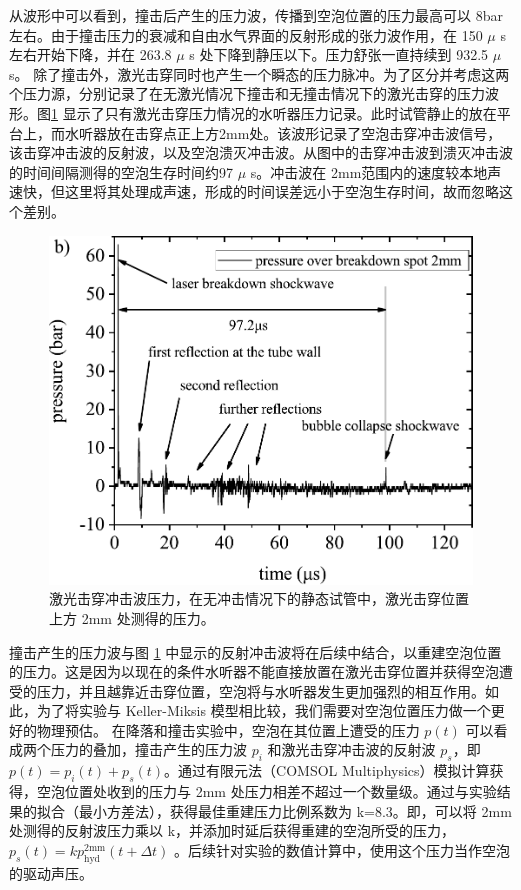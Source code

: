 从波形中可以看到，撞击后产生的压力波，传播到空泡位置的压力最高可以 8bar
左右。由于撞击压力的衰减和自由水气界面的反射形成的张力波作用，在 150
$\mu$ s 左右开始下降，并在 263.8 $\mu$ s
处下降到静压以下。压力舒张一直持续到 932.5 $\mu$ s。
除了撞击外，激光击穿同时也产生一个瞬态的压力脉冲。为了区分并考虑这两个压力源，分别记录了在无激光情况下撞击和无撞击情况下的激光击穿的压力波形。图\ref{fig:5.5}
显示了只有激光击穿压力情况的水听器压力记录。此时试管静止的放在平台上，而水听器放在击穿点正上方2mm处。该波形记录了空泡击穿冲击波信号，该击穿冲击波的反射波，以及空泡溃灭冲击波。从图中的击穿冲击波到溃灭冲击波的时间间隔测得的空泡生存时间约97 $\mu$ s。冲击波在 2mm范围内的速度较本地声速快，但这里将其处理成声速，形成的时间误差远小于空泡生存时间，故而忽略这个差别。

\begin{figure}[H]
  \centering
  \includegraphics[width=0.8\linewidth]{img/fig5.5-eps-converted-to.pdf}
  \caption[激光击穿冲击波压力]{激光击穿冲击波压力，在无冲击情况下的静态试管中，激光击穿位置上方 2mm
处测得的压力。}
  \label{fig:5.5}
\end{figure}

撞击产生的压力波与图 \ref{fig:5.5}
中显示的反射冲击波将在后续中结合，以重建空泡位置的压力。这是因为以现在的条件水听器不能直接放置在激光击穿位置并获得空泡遭受的压力，并且越靠近击穿位置，空泡将与水听器发生更加强烈的相互作用。如此，为了将实验与
Keller-Miksis 模型相比较，我们需要对空泡位置压力做一个更好的物理预估。
在降落和撞击实验中，空泡在其位置上遭受的压力 $p(t)$
可以看成两个压力的叠加，撞击产生的压力波 $p_i$
和激光击穿冲击波的反射波 $p_s$，即
$p (t)= p_i(t)+ p_s(t)$。通过有限元法（COMSOL
Multiphysics）模拟计算获得，空泡位置处收到的压力与 2mm
处压力相差不超过一个数量级。通过与实验结果的拟合（最小方差法），获得最佳重建压力比例系数为
k=8.3。即，可以将 2mm 处测得的反射波压力乘以
k，并添加时延后获得重建的空泡所受的压力，$p_s (t)=k p_\mathrm{hyd}^\mathrm{2mm}(t+\Delta t)$
。后续针对实验的数值计算中，使用这个压力当作空泡的驱动声压。

